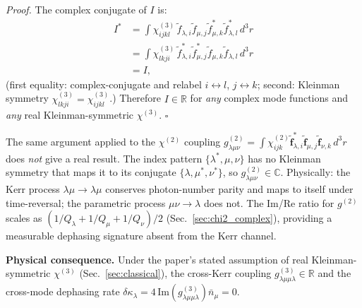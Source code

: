 \documentclass[12pt]{article}
\newcommand{\tf}{\tilde{\mathbf{f}}}
\begin{document}
\begin{remark}
\textit{Proof.} The complex conjugate of $I$ is:
\begin{align}
  I^* &= \int\chi^{(3)}_{ijkl}\,
  \tilde{f}_{\lambda,i}\tilde{f}_{\mu,j}
  \tilde{f}^*_{\mu,k}\tilde{f}^*_{\lambda,l}\,d^3r \nonumber\\
  &= \int\chi^{(3)}_{lkji}\,
  \tilde{f}^*_{\lambda,i}\tilde{f}^*_{\mu,j}
  \tilde{f}_{\mu,k}\tilde{f}_{\lambda,l}\,d^3r \nonumber\\
  &= I,
  \label{eq:kleinman_proof}
\end{align}
(first equality: complex-conjugate and relabel $i\leftrightarrow l$,
$j\leftrightarrow k$; second: Kleinman symmetry $\chi^{(3)}_{lkji}=\chi^{(3)}_{ijkl}$.)
Therefore $I\in\mathbb{R}$ for \emph{any} complex mode functions and
\emph{any} real Kleinman-symmetric $\chi^{(3)}$. $\square$
\end{remark}

\begin{remark}
The same argument applied to the $\chi^{(2)}$ coupling
$g^{(2)}_{\lambda\mu\nu}=
\int\chi^{(2)}_{ijk}\tf^*_{\lambda,i}\tf_{\mu,j}\tf_{\nu,k}\,d^3r$
does \emph{not} give a real result.  The index pattern
$\{\lambda^*,\mu,\nu\}$ has no Kleinman symmetry that maps it to its
conjugate $\{\lambda,\mu^*,\nu^*\}$, so $g^{(2)}_{\lambda\mu\nu}\in\mathbb{C}$.
Physically: the Kerr process $\lambda\mu\to\lambda\mu$ conserves
photon-number parity and maps to itself under time-reversal;
the parametric process $\mu\nu\to\lambda$ does not.
The Im/Re ratio for $g^{(2)}$ scales as
$(1/Q_\lambda+1/Q_\mu+1/Q_\nu)/2$
(Sec.~\ref{sec:chi2_complex}), providing a measurable dephasing
signature absent from the Kerr channel.
\end{remark}

\textbf{Physical consequence.} Under the paper's stated assumption of
real Kleinman-symmetric $\chi^{(3)}$ (Sec.~\ref{sec:classical}), the
cross-Kerr coupling $g^{(3)}_{\lambda\mu\mu\lambda}\in\mathbb{R}$
and the cross-mode dephasing rate
$\delta\kappa_\lambda = 4\,\mathrm{Im}(g^{(3)}_{\lambda\mu\mu\lambda})\bar{n}_\mu = 0$.
\end{document}

